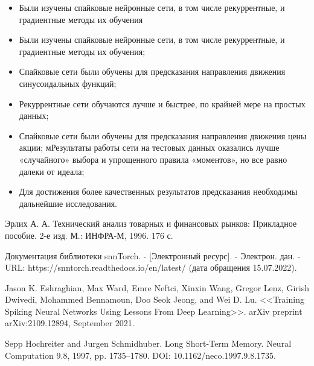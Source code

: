 \documentclass[a4paper,fontsize=12pt,titlepage,final]{scrartcl}
\begin{document}
\begin{itemize}
    \item Были изучены спайковые нейронные сети, в том числе рекуррентные, и градиентные методы их обучения
    \item Были изучены спайковые нейронные сети, в том числе рекуррентные, и градиентные методы их обучения;
    \item Спайковые сети были обучены для предсказания направления движения синусоидальных функций;
    \item Рекуррентные сети обучаются лучше и быстрее, по крайней мере на простых данных;
    \item Спайковые сети были обучены для предсказания направления движения цены акции;
    мРезультаты работы сети на тестовых данных оказались лучше «случайного» выбора и упрощенного правила «моментов», но все равно далеки от идеала;
    \item Для достижения более качественных результатов предсказания необходимы дальнейшие исследования.
\end{itemize}


\begin{thebibliography}{}

Эрлих А. А. Технический анализ товарных и финансовых рынков: Прикладное пособие. 2-е изд. М.: ИНФРА-М, 1996. 176 с.

Документация библиотеки snnTorch. - [Электронный ресурс]. - Электрон. дан. - URL: https://snntorch.readthedocs.io/en/latest/ (дата обращения 15.07.2022).

Jason K. Eshraghian, Max Ward, Emre Neftci, Xinxin Wang, Gregor Lenz, Girish Dwivedi, Mohammed Bennamoun, Doo Seok Jeong, and Wei D. Lu. <<Training Spiking Neural Networks Using Lessons From Deep Learning>>. arXiv preprint arXiv:2109.12894, September 2021.

Sepp Hochreiter and Jurgen Schmidhuber. Long Short-Term Memory. Neural Computation 9.8, 1997, pp. 1735–1780. DOI: 10.1162/neco.1997.9.8.1735.

\end{thebibliography}
\end{document}
